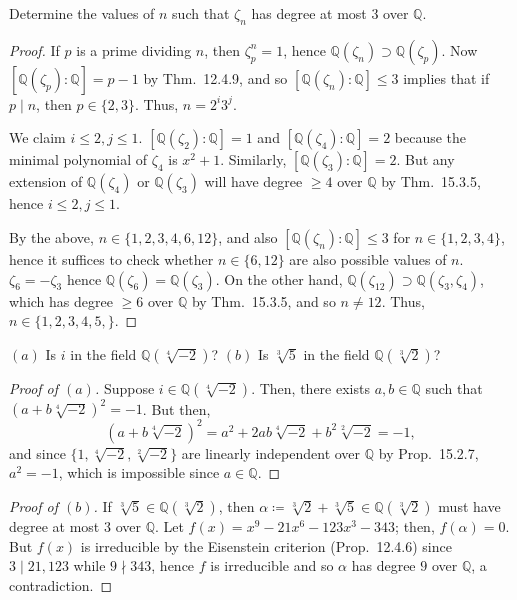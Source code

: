 \documentclass[12pt]{article}
\theoremstyle{remark}
\begin{document}
\setcounter{subsubsection}{4}
\begin{problem}
  Determine the values of $n$ such that $\zeta_n$ has degree at most $3$ over $\mathbb{Q}$.
\end{problem}
\begin{proof}
  If $p$ is a prime dividing $n$, then $\zeta_p^n = 1$, hence $\mathbb{Q}(\zeta_n) \supset \mathbb{Q}(\zeta_p)$. Now $[\mathbb{Q}(\zeta_p):\mathbb{Q}] = p-1$ by Thm.~12.4.9, and so $[\mathbb{Q}(\zeta_n):\mathbb{Q}] \le 3$ implies that if $p \mid n$, then $p \in \{2,3\}$. Thus, $n=2^i3^j$.
  \par We claim $i \le 2, j \le 1$. $[\mathbb{Q}(\zeta_2) : \mathbb{Q}] = 1$ and $[\mathbb{Q}(\zeta_4) : \mathbb{Q}] = 2$ because the minimal polynomial of $\zeta_4$ is $x^2+1$. Similarly, $[\mathbb{Q}(\zeta_3) : \mathbb{Q}] = 2$. But any extension of $\mathbb{Q}(\zeta_4)$ or $\mathbb{Q}(\zeta_3)$ will have degree $\ge4$ over $\mathbb{Q}$ by Thm.~15.3.5, hence $i \le 2, j \le 1$.
  \par By the above, $n \in \{1,2,3,4,6,12\}$, and also $[\mathbb{Q}(\zeta_n) : \mathbb{Q}] \le 3$ for $n \in \{1,2,3,4\}$, hence it suffices to check whether $n \in \{6,12\}$ are also possible values of $n$. $\zeta_6 = -\zeta_3$ hence $\mathbb{Q}(\zeta_6) = \mathbb{Q}(\zeta_3)$. On the other hand, $\mathbb{Q}(\zeta_{12}) \supset \mathbb{Q}(\zeta_3,\zeta_4)$, which has degree $\ge 6$ over $\mathbb{Q}$ by Thm.~15.3.5, and so $n \ne 12$. Thus, $n \in \{1,2,3,4,5,\}$. 
\end{proof}

\setcounter{subsubsection}{6}
\begin{problem}
  $(a)$ Is $i$ in the field $\mathbb{Q}(\sqrt[4]{-2})$? $(b)$ Is $\sqrt[3]{5}$ in the field $\mathbb{Q}(\sqrt[3]{2})$?
\end{problem}
\begin{proof}[Proof of $(a)$]
  Suppose $i \in \mathbb{Q}(\sqrt[4]{-2})$. Then, there exists $a,b \in \mathbb{Q}$ such that $(a + b\sqrt[4]{-2})^2 = -1$. But then,
  \begin{equation*}
    (a + b\sqrt[4]{-2})^2 = a^2 + 2ab\sqrt[4]{-2} + b^2\sqrt[2]{-2} = -1,
  \end{equation*}
  and since $\{1,\sqrt[4]{-2},\sqrt[2]{-2}\}$ are linearly independent over $\mathbb{Q}$ by Prop.~15.2.7, $a^2=-1$, which is impossible since $a \in \mathbb{Q}$.
\end{proof}
\begin{proof}[Proof of $(b)$]
  If $\sqrt[3]{5} \in \mathbb{Q}(\sqrt[3]{2})$, then $\alpha \coloneqq \sqrt[3]{2} + \sqrt[3]{5} \in \mathbb{Q}(\sqrt[3]{2})$ must have degree at most $3$ over $\mathbb{Q}$. Let $f(x) = x^9 - 21x^6 - 123x^3 - 343$; then, $f(\alpha) = 0$. But $f(x)$ is irreducible by the Eisenstein criterion (Prop.~12.4.6) since $3 \mid 21,123$ while $9 \nmid 343$, hence $f$ is irreducible and so $\alpha$ has degree $9$ over $\mathbb{Q}$, a contradiction.
\end{proof}
\end{document}
